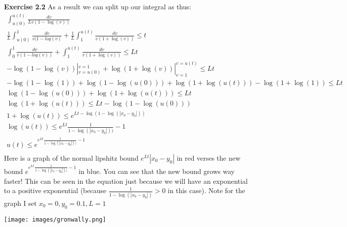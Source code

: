 \documentclass[12pt]{article}
\newenvironment{exercise}[1]{\vspace{.1in}\noindent\textbf{Exercise #1 \hspace{.05em}}}{}
\begin{document}
\begin{exercise}{2.2}
	As a result we can split up our integral as thus:
	\begin{align}
		\int_{u(0)}^{u(t)}\frac{dv}{Lv(1-\log(v))}                                                            \\
		\frac{1}{L}\int_{u(0)}^{1}\frac{dv}{v(1-log(v)}+\frac{1}{L}\int_1^{u(t)}\frac{dv}{v(1+\log(v))}\leq t \\
		\int_{0}^{1}\frac{dv}{v(1-log(v))}+\int_1^{u(t)}\frac{dv}{v(1+\log(v))}\leq Lt                        \\
		-\log(1-\log(v))|_{v=u(0)}^{v=1}+\log(1+\log(v))|_{v=1}^{v=u(t)}\leq Lt                               \\
		-\log(1-\log(1))+\log(1-\log(u(0)))+\log(1+\log(u(t)))-\log(1+\log(1))\leq Lt                         \\
		\log(1-\log(u(0)))+\log(1+\log(u(t)))\leq Lt                                                          \\
		\log(1+\log(u(t)))\leq Lt-\log(1-\log(u(0)))                                                          \\
		1+\log(u(t))\leq e^{Lt-\log(1-\log(|x_0-y_0|))}                                                       \\
		\log(u(t))\leq e^{Lt}\frac{1}{1-\log(|x_0-y_0|))}-1                                                   \\
		u(t)\leq e^{e^{Lt}\frac{1}{1-\log(|x_0-y_0|))}-1}                                                     \\
	\end{align}
	Here is a graph of the normal lipshitz bound $e^{Lt}|x_0-y_0|$ in red verses the new bound $e^{e^{Lt}\frac{1}{1-\log(|x_0-y_0|))}-1}$ in blue. You can see that the new bound grows way faster! This can be seen in the equation just because we will have an exponential to a positive exponential (because $\frac{1}{1-\log(|x_0-y_0|)}>0$ in this case). Note for the graph I set $x_0=0,y_0=0.1,L=1$

	\texttt{[image: images/gronwally.png]}



\end{exercise}
\end{document}
